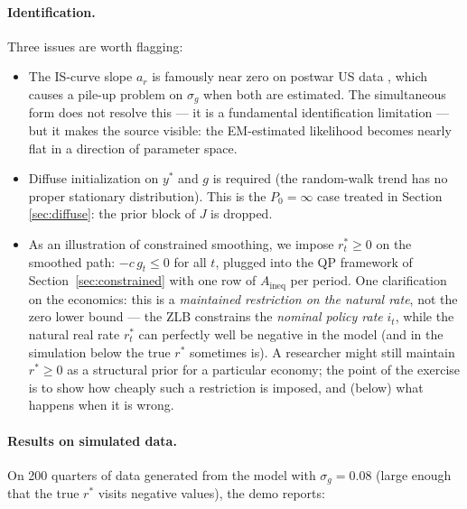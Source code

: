 \documentclass[11pt]{article}
\begin{document}
\paragraph{Identification.}  Three issues are worth flagging:
\begin{itemize}[leftmargin=2em]
\item The IS-curve slope $a_r$ is famously near zero on
  postwar US data \citep{HolstonLaubachWilliams2017}, which causes a
  pile-up problem on $\sigma_g$ when both are estimated.  The
  simultaneous form does not resolve this --- it is a fundamental
  identification limitation --- but it makes the source visible: the
  EM-estimated likelihood becomes nearly flat in a direction of
  parameter space.
\item Diffuse initialization on $y^*$ and $g$ is required (the
  random-walk trend has no proper stationary distribution).  This is
  the $P_0=\infty$ case treated in Section \ref{sec:diffuse}: the
  prior block of $J$ is dropped.
\item As an illustration of constrained smoothing, we impose
  $r^*_t\ge 0$ on the smoothed path: $-c\,g_t\le 0$ for all $t$,
  plugged into the QP framework of Section~\ref{sec:constrained} with
  one row of $A_{\text{ineq}}$ per period.  One clarification on the
  economics: this is a \emph{maintained restriction on the natural
  rate}, not the zero lower bound --- the ZLB constrains the
  \emph{nominal policy rate} $i_t$, while the natural real rate
  $r^*_t$ can perfectly well be negative in the model (and in the
  simulation below the true $r^*$ sometimes is).  A researcher might
  still maintain $r^*\ge 0$ as a structural prior for a particular
  economy; the point of the exercise is to show how cheaply such a
  restriction is imposed, and (below) what happens when it is wrong.
\end{itemize}

\paragraph{Results on simulated data.}  On 200 quarters of data
generated from the model with $\sigma_g=0.08$ (large enough that
the true $r^*$ visits negative values), the demo reports:
\end{document}
